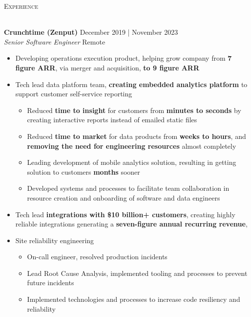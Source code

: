 \documentclass[a4paper]{article}
\newcommand{\lineunder} {
    \vspace*{-8pt} \\
    \hspace*{-18pt} {\color{Mahogany} \hrulefill} \\
}
\newcommand{\header} [1] {
    \vspace{4mm}
    {\hspace*{-18pt}\vspace*{6pt} \large \textsc{\textcolor{Mahogany}{#1}}}
    \vspace*{-6pt} \lineunder
}
\newenvironment{jobdetails}%
    {\list{}{\leftmargin=4mm}\item[]}%
    {\endlist}
\begin{document}
\pagebreak


\header{Experience}
\vspace{1mm}

\textbf{Crunchtime (Zenput)} \hfill December 2019 | November 2023 \\
\textit{Senior Software Engineer} \hfill Remote \\
\vspace{2mm}

\begin{jobdetails}
\begin{itemize} \itemsep 1pt
    \item Developing operations execution product, helping grow company from \textbf{7 figure ARR}, via merger and acquisition, \textbf{to 9 figure ARR}
    \item Tech lead data platform team, \textbf{creating embedded analytics platform} to support customer self-service reporting
        \begin{itemize}
            \item Reduced \textbf{time to insight} for customers from \textbf{minutes to seconds} by creating interactive reports instead of emailed static files
            \item Reduced \textbf{time to market} for data products from \textbf{weeks to hours}, and \textbf{removing the need for engineering resources} almost completely
            \item Leading development of mobile analytics solution, resulting in getting solution to customers \textbf{months} sooner
            \item Developed systems and processes to facilitate team collaboration in resource creation and onboarding of software and data engineers
        \end{itemize}
    \item Tech lead \textbf{integrations with \$10 billion+ customers}, creating highly reliable integrations  generating a \textbf{seven-figure annual recurring revenue},
    \item Site reliability engineering
        \begin{itemize}
            \item On-call engineer, resolved production incidents
            \item Lead Root Cause Analysis, implemented tooling and processes to prevent future incidents
            \item Implemented technologies and processes to increase code resiliency and reliability

\end{itemize}
\end{itemize}
\end{jobdetails}
\end{document}
